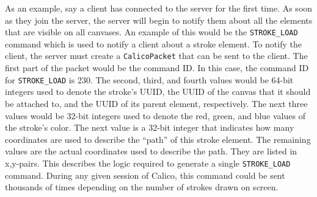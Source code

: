As an example, say a client has connected to the server for the first time. As soon as they join the server, the server will begin to notify them about all the elements that are visible on all canvases. An example of this would be the \texttt{STROKE\_LOAD} command which is used to notify a client about a stroke element. To notify the client, the server must create a \texttt{CalicoPacket} that can be sent to the client. The first part of the packet would be the command ID. In this case, the command ID for \texttt{STROKE\_LOAD} is 230. The second, third, and fourth values would be 64-bit integers used to denote the stroke's UUID, the UUID of the canvas that it should be attached to, and the UUID of its parent element, respectively. The next three values would be 32-bit integers used to denote the red, green, and blue values of the stroke's color. The next value is a 32-bit integer that indicates how many coordinates are used to describe the ``path'' of this stroke element. The remaining values are the actual coordinates used to describe the path. They are listed in x,y-pairs. This describes the logic required to generate a single \texttt{STROKE\_LOAD} command. During any given session of Calico, this command could be sent thousands of times depending on the number of strokes drawn on screen.



